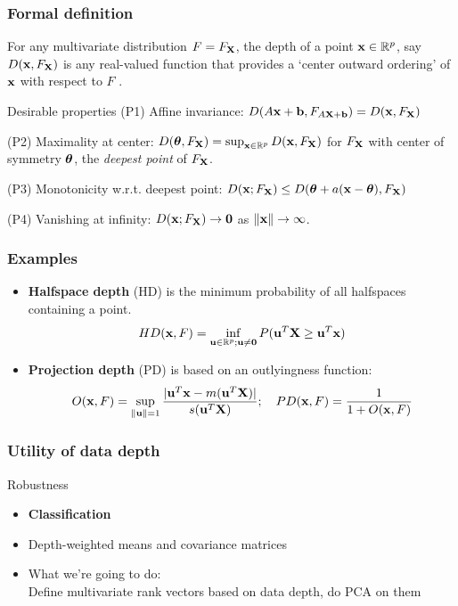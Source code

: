 \documentclass[handout,10pt]{beamer}
\begin{document}
\begin{frame}
\frametitle{Formal definition}
For any multivariate distribution $F = F_{\mathbf{X}}$, the depth of a point ${\bf{x}} \in \mathbb{R}^p$, say $D({\bf{x}}, F_{\mathbf{X}})$ is any real-valued function that provides a `center outward ordering' of ${\bf{x}}$ with respect to $F$ \citep{zuo00}.

\vspace{.5cm}
\begin{block}{Desirable properties \citep{liu90}}
(P1) {\colbit Affine invariance}: $D(A{\bf{x}} + {\bf{b}}, F_{A{\mathbf{X}}+{\bf{b}}}) = D({\bf{x}}, F_{\mathbf{X}})$
\vspace{.2cm}

(P2) {\colbit Maximality at center}: $D({\boldsymbol{\theta}}, F_{\mathbf{X}}) = \sup_{{\bf{x}}\in \mathbb{R}^p} D({\bf{x}}, F_{\mathbf{X}})$ for $F_{\mathbf{X}}$ with center of symmetry ${\boldsymbol{\theta}}$, the \textit{deepest point} of $F_{\mathbf{X}}$.
\vspace{.2cm}

(P3) {\colbit Monotonicity w.r.t. deepest point}: $D({\bf{x}}; F_{\mathbf{X}}) \leq D({\boldsymbol{\theta}} + a({\bf{x}} - {\boldsymbol{\theta}}), F_{\mathbf{X}})$
\vspace{.5cm}

(P4) {\colbit Vanishing at infinity}: $D({\bf{x}}; F_{\mathbf{X}}) \rightarrow \bf0$ as $\|{\bf{x}}\| \rightarrow \infty $.
\end{block}
\end{frame}

\begin{frame}
\frametitle{Examples}
\begin{itemize}
\item \textbf{Halfspace depth} (HD) \citep{tukey75} is the minimum probability of all halfspaces containing a point.
$$ HD({\bf{x}}, F)  = \inf_{{\bf{u}} \in \mathbb{R}^p; {\bf{u}} \neq \bf0} P({\bf{u}}^T {\mathbf{X}} \geq {\bf{u}}^T {\bf{x}}) $$

\item \textbf{Projection depth} (PD) \citep{zuo03} is based on an outlyingness function:
$$ O({\bf{x}}, F) = \sup_{\| {\bf{u}} \| = 1} \frac{| {\bf{u}}^T{\bf{x}} - m({\bf{u}}^T{\mathbf{X}})|}{s({\bf{u}}^T{\mathbf{X}})}; \quad PD({\bf{x}}, F) = \frac{1}{1+O({\bf{x}}, F)} $$
\end{itemize}
\end{frame}

\begin{frame}
\frametitle{Utility of data depth}
{\colbbf Robustness}

\begin{itemize}
\item \textbf{Classification}
\vspace{.2cm}

\item Depth-weighted means and covariance matrices
\vspace{.2cm}

\item What we're going to do:\\Define multivariate rank vectors based on data depth, do PCA on them
\end{itemize}
\end{frame}
\end{document}
